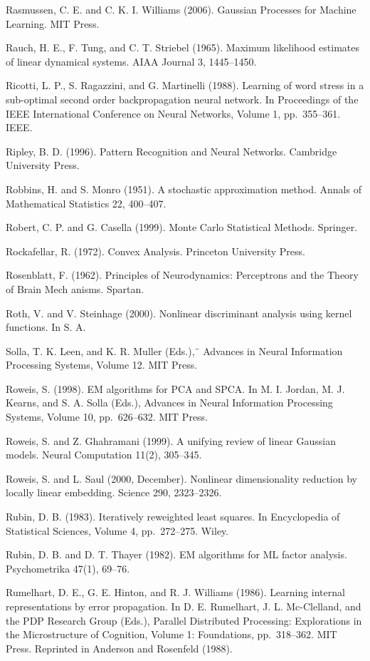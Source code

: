 \documentclass[
  10
]{article}
\begin{document}
Rasmussen, C. E. and C. K. I. Williams (2006). Gaussian Processes for
Machine Learning. MIT Press.

Rauch, H. E., F. Tung, and C. T. Striebel (1965). Maximum likelihood
estimates of linear dynamical systems. AIAA Journal 3, 1445--1450.

Ricotti, L. P., S. Ragazzini, and G. Martinelli (1988). Learning of word
stress in a sub-optimal second order backpropagation neural network. In
Proceedings of the IEEE International Conference on Neural Networks,
Volume 1, pp.~355--361. IEEE.

Ripley, B. D. (1996). Pattern Recognition and Neural Networks. Cambridge
University Press.

Robbins, H. and S. Monro (1951). A stochastic approximation method.
Annals of Mathematical Statistics 22, 400--407.

Robert, C. P. and G. Casella (1999). Monte Carlo Statistical Methods.
Springer.

Rockafellar, R. (1972). Convex Analysis. Princeton University Press.

Rosenblatt, F. (1962). Principles of Neurodynamics: Perceptrons and the
Theory of Brain Mech anisms. Spartan.

Roth, V. and V. Steinhage (2000). Nonlinear discriminant analysis using
kernel functions. In S. A.

Solla, T. K. Leen, and K. R. Muller (Eds.),¨ Advances in Neural
Information Processing Systems, Volume 12. MIT Press.

Roweis, S. (1998). EM algorithms for PCA and SPCA. In M. I. Jordan, M.
J. Kearns, and S. A. Solla (Eds.), Advances in Neural Information
Processing Systems, Volume 10, pp.~626--632. MIT Press.

Roweis, S. and Z. Ghahramani (1999). A unifying review of linear
Gaussian models. Neural Computation 11(2), 305--345.

Roweis, S. and L. Saul (2000, December). Nonlinear dimensionality
reduction by locally linear embedding. Science 290, 2323--2326.

Rubin, D. B. (1983). Iteratively reweighted least squares. In
Encyclopedia of Statistical Sciences, Volume 4, pp.~272--275. Wiley.

Rubin, D. B. and D. T. Thayer (1982). EM algorithms for ML factor
analysis. Psychometrika 47(1), 69--76.

Rumelhart, D. E., G. E. Hinton, and R. J. Williams (1986). Learning
internal representations by error propagation. In D. E. Rumelhart, J. L.
Mc-Clelland, and the PDP Research Group (Eds.), Parallel Distributed
Processing: Explorations in the Microstructure of Cognition, Volume 1:
Foundations, pp.~318--362. MIT Press. Reprinted in Anderson and
Rosenfeld (1988).
\end{document}

